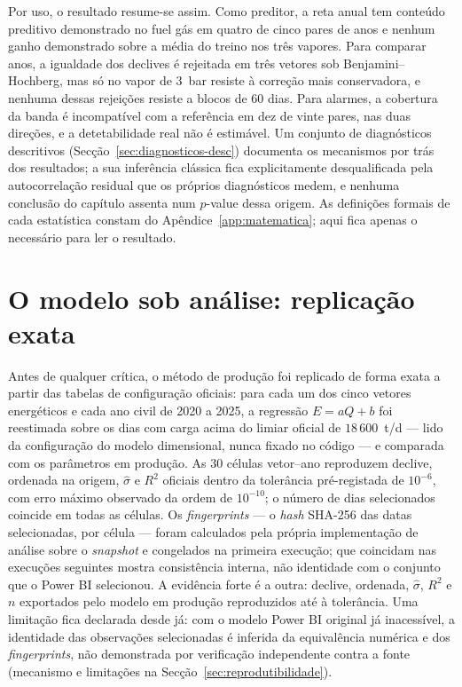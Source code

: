 Por uso, o resultado resume-se assim. Como preditor, a reta anual tem
conteúdo preditivo demonstrado no fuel gás em quatro de cinco pares de
anos e nenhum ganho demonstrado sobre a média do treino nos três vapores.
Para comparar anos, a igualdade dos declives é rejeitada em três vetores
sob Benjamini--Hochberg, mas só no vapor de 3~bar resiste à correção mais
conservadora, e nenhuma dessas rejeições resiste a blocos de 60 dias. Para
alarmes, a cobertura da banda é incompatível com a referência em dez de
vinte pares, nas duas direções, e a detetabilidade real não é estimável. Um
conjunto de diagnósticos descritivos (Secção~\ref{sec:diagnosticos-desc})
documenta os mecanismos por trás dos resultados; a sua inferência clássica
fica explicitamente desqualificada pela autocorrelação residual que os
próprios diagnósticos medem, e nenhuma conclusão do capítulo assenta num
$p$-value dessa origem. As definições formais de cada estatística constam do
Apêndice~\ref{app:matematica}; aqui fica apenas o necessário para ler o
resultado.

\section{O modelo sob análise: replicação exata}
\label{sec:replicacao}

Antes de qualquer crítica, o método de produção foi replicado de forma exata a
partir das tabelas de configuração oficiais: para cada um dos cinco vetores
energéticos e cada ano civil de 2020 a 2025, a regressão $E = aQ + b$ foi
reestimada sobre os dias com carga acima do limiar oficial de
$18\,600$~t/d --- lido da configuração do modelo dimensional, nunca fixado no
código --- e comparada com os parâmetros em produção. As 30 células
vetor--ano reproduzem declive, ordenada na origem, $\hat\sigma$ e $R^2$
oficiais dentro da tolerância pré-registada de $10^{-6}$, com erro máximo
observado da ordem de $10^{-10}$; o número de dias selecionados coincide
em todas as células. Os \emph{fingerprints} --- o \emph{hash} SHA-256 das datas
selecionadas, por célula --- foram calculados pela própria implementação de
análise sobre o \emph{snapshot} e congelados na primeira execução; que
coincidam nas execuções seguintes mostra consistência interna, não
identidade com o conjunto que o Power BI selecionou. A evidência forte é a
outra: declive, ordenada, $\hat\sigma$, $R^2$ e $n$ exportados pelo modelo em
produção reproduzidos até à tolerância. Uma limitação fica declarada desde
já: com o modelo Power BI original já
inacessível, a identidade das observações selecionadas é inferida da
equivalência numérica e dos \emph{fingerprints}, não demonstrada por
verificação independente contra a fonte
(mecanismo e limitações na Secção~\ref{sec:reprodutibilidade}).

